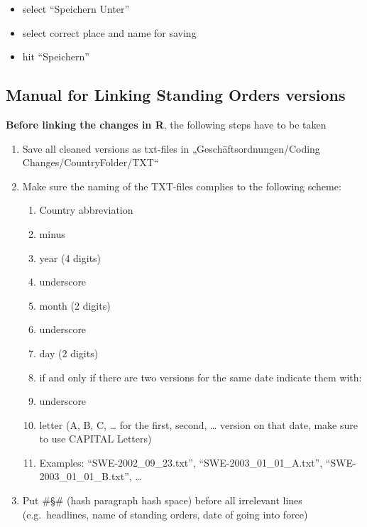 \documentclass[10pt,]{article}
\providecommand{\tightlist}{%
  \setlength{\itemsep}{0pt}\setlength{\parskip}{0pt}}
\begin{document}
\begin{itemize}
  \begin{itemize}
  \tightlist
  \item
    select ``Speichern Unter''
  \item
    select correct place and name for saving
  \item
    hit ``Speichern''
  \end{itemize}
\end{itemize}

\newpage

\subsection{Manual for Linking Standing Orders
versions}\label{manual-for-linking-standing-orders-versions}

\textbf{Before linking the changes in R}, the following steps have to be
taken

\begin{enumerate}
\def\labelenumi{\arabic{enumi})}
\tightlist
\item
  Save all cleaned versions as txt-files in „Geschäftsordnungen/Coding
  Changes/CountryFolder/TXT``
\item
  Make sure the naming of the TXT-files complies to the following
  scheme:

  \begin{enumerate}
  \def\labelenumii{\alph{enumii}.}
  \tightlist
  \item
    Country abbreviation
  \item
    minus
  \item
    year (4 digits)
  \item
    underscore
  \item
    month (2 digits)
  \item
    underscore
  \item
    day (2 digits)
  \item
    if and only if there are two versions for the same date indicate
    them with:
  \item
    underscore
  \item
    letter (A, B, C, \ldots{} for the first, second, \ldots{} version on
    that date, make sure to use CAPITAL Letters)
  \item
    Examples: ``SWE-2002\_09\_23.txt'', ``SWE-2003\_01\_01\_A.txt'',
    ``SWE-2003\_01\_01\_B.txt'', \ldots{}
  \end{enumerate}
\item
  Put \#§\# (hash paragraph hash space) before all irrelevant lines
  (e.g.~headlines, name of standing orders, date of going into force)
\end{enumerate}
\end{document}
